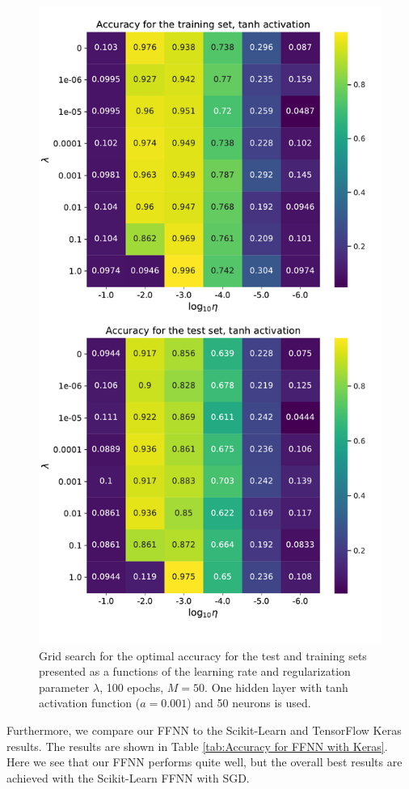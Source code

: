 \documentclass{emulateapj}
\begin{document}
\begin{figure}[h]
    \centering
    \includegraphics[width=.49\textwidth]{Figures/Class_Ridge_1_layer_tanh.pdf}
    \caption{Grid search for the optimal accuracy for the test and training sets presented as a functions of the learning rate and regularization parameter $\lambda$, 100 epochs, $M=50$. One hidden layer with tanh activation function ($a=0.001$) and 50 neurons is used.}
    \label{fig: grid search class 1 layer tanh}
\end{figure}


Furthermore, we compare our FFNN to the Scikit-Learn and TensorFlow Keras results. The results are shown in Table \ref{tab:Accuracy for FFNN with Keras}. Here we see that our FFNN performs quite well, but the overall best results are achieved with the Scikit-Learn FFNN with SGD. 
\end{document}
